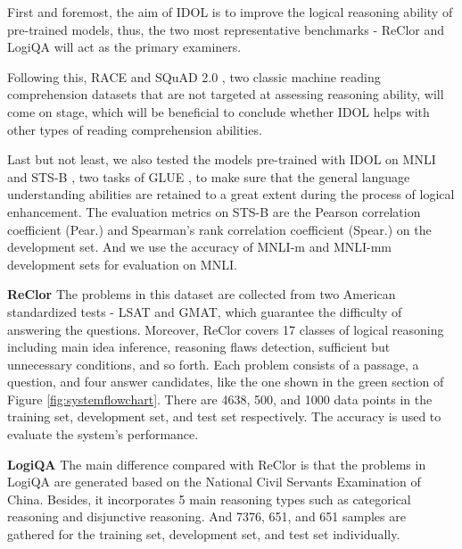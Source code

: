 \documentclass[11pt]{article}
\begin{document}
First and foremost, the aim of IDOL is to improve the logical reasoning ability of pre-trained models, thus, the two most representative benchmarks - ReClor and LogiQA will act as the primary examiners.

Following this, RACE \cite{lai-etal-2017-race} and SQuAD 2.0 \cite{squad2.0}, two classic machine reading comprehension datasets that are not targeted at assessing reasoning ability, will come on stage, which will be beneficial to conclude whether IDOL helps with other types of reading comprehension abilities.

Last but not least, we also tested the models pre-trained with IDOL on MNLI \cite{mnli} and STS-B \cite{stsb}, two tasks of GLUE \cite{glue}, to make sure that the general language understanding abilities are retained to a great extent during the process of logical enhancement. The evaluation metrics on STS-B are the Pearson correlation coefficient (Pear.) and Spearman's rank correlation coefficient (Spear.) on the development set. And we use the accuracy of MNLI-m and MNLI-mm development sets for evaluation on MNLI.

\textbf{ReClor} The problems in this dataset are collected from two American standardized tests - LSAT and GMAT, which guarantee the difficulty of answering the questions. Moreover, ReClor covers 17 classes of logical reasoning including main idea inference, reasoning flaws detection, sufficient but unnecessary conditions, and so forth. Each problem consists of a passage, a question, and four answer candidates, like the one shown in the green section of Figure \ref{fig:systemflowchart}. There are 4638, 500, and 1000 data points in the training set, development set, and test set respectively. The accuracy is used to evaluate the system's performance.

\textbf{LogiQA} The main difference compared with ReClor is that the problems in LogiQA are generated based on the National Civil Servants Examination of China. Besides, it incorporates 5 main reasoning types such as categorical reasoning and disjunctive reasoning. And 7376, 651, and 651 samples are gathered for the training set, development set, and test set individually.
\end{document}
